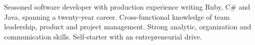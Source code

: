 

\begin{cvparagraph}

Seasoned software developer with production experience writing Ruby, C\# and Java, 
spanning a twenty-year career. Cross-functional knowledge of team leadership, product and
project management. Strong analytic, organization and communication skills. Self-starter
with an entrepreneurial drive.
\end{cvparagraph}

